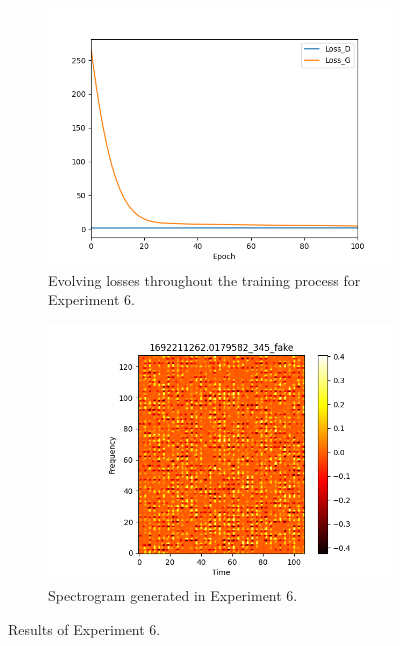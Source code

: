 \begin{figure}[!ht]
    \centering
    \begin{subfigure}{0.45\textwidth}
        \includegraphics[width=\textwidth]{figures/4.5-results/exp6_loss.png}
        \caption{Evolving losses throughout the training process for Experiment 6.}
        \label{fig:exp6_loss}
    \end{subfigure}
    \begin{subfigure}{0.45\textwidth}
        \includegraphics[width=\textwidth]{figures/4.5-results/exp6_spectrogram.png}
        \caption{Spectrogram generated in Experiment 6.}
        \label{fig:exp6_spectrogram}
    \end{subfigure}
    \caption{Results of Experiment 6.}
    \label{fig:exp6_results}
\end{figure}